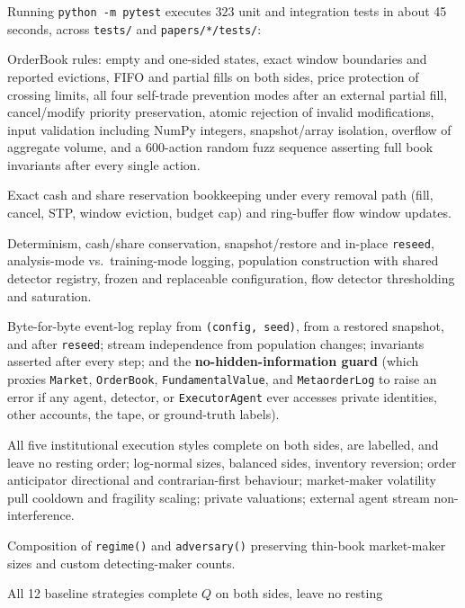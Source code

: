 \documentclass[11pt,a4paper]{article}
\newcommand{\code}[1]{\texttt{#1}}
\begin{document}
Running \code{python -m pytest} executes $323$ unit and integration tests in about 45 seconds, across \code{tests/} and \code{papers/*/tests/}:
\begin{description}[nosep]
\item[\code{test\_book.py}] OrderBook rules: empty and one-sided states, exact window boundaries and
  reported evictions, FIFO and partial fills on both sides, price protection of crossing limits, all four
  self-trade prevention modes after an external partial fill, cancel/modify priority preservation, atomic
  rejection of invalid modifications, input validation including NumPy integers, snapshot/array isolation,
  overflow of aggregate volume, and a 600-action random fuzz sequence asserting full book invariants
  after every single action.
\item[\code{test\_market.py}] Exact cash and share reservation bookkeeping under every removal path
  (fill, cancel, STP, window eviction, budget cap) and ring-buffer flow window updates.
\item[\code{test\_simulator.py}] Determinism, cash/share conservation, snapshot/restore and in-place
  \code{reseed}, analysis-mode vs.\ training-mode logging, population construction with shared detector
  registry, frozen and replaceable configuration, flow detector thresholding and saturation.
\item[\code{test\_foundations.py}] Byte-for-byte event-log replay from \code{(config, seed)}, from a
  restored snapshot, and after \code{reseed}; stream independence from population changes; invariants
  asserted after every step; and the \textbf{no-hidden-information guard} (which proxies \code{Market},
  \code{OrderBook}, \code{FundamentalValue}, and \code{MetaorderLog} to raise an error if any agent,
  detector, or \code{ExecutorAgent} ever accesses private identities, other accounts, the tape, or
  ground-truth labels).
\item[\code{test\_agents.py}] All five institutional execution styles complete on both sides, are
  labelled, and leave no resting order; log-normal sizes, balanced sides, inventory reversion; order
  anticipator directional and contrarian-first behaviour; market-maker volatility pull cooldown and
  fragility scaling; private valuations; external agent stream non-interference.
\item[\code{test\_presets.py}] Composition of \code{regime()} and \code{adversary()} preserving thin-book
  market-maker sizes and custom detecting-maker counts.
\item[\code{test\_execution.py}] All 12 baseline strategies complete $Q$ on both sides, leave no resting

\end{description}
\end{document}
